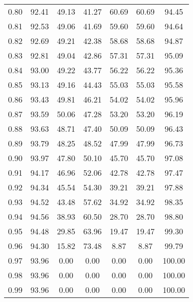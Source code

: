 \begin{tabular}{|c|c|c|c|c|c|c|}
      0.80 &     92.41 &     49.13 &      41.27 &   60.69 &      60.69 &         94.45 \\
      0.81 &     92.53 &     49.06 &      41.69 &   59.60 &      59.60 &         94.64 \\
      0.82 &     92.69 &     49.21 &      42.38 &   58.68 &      58.68 &         94.87 \\
      0.83 &     92.81 &     49.04 &      42.86 &   57.31 &      57.31 &         95.09 \\
      0.84 &     93.00 &     49.22 &      43.77 &   56.22 &      56.22 &         95.36 \\
      0.85 &     93.13 &     49.16 &      44.43 &   55.03 &      55.03 &         95.58 \\
      0.86 &     93.43 &     49.81 &      46.21 &   54.02 &      54.02 &         95.96 \\
      0.87 &     93.59 &     50.06 &      47.28 &   53.20 &      53.20 &         96.19 \\
      0.88 &     93.63 &     48.71 &      47.40 &   50.09 &      50.09 &         96.43 \\
      0.89 &     93.79 &     48.25 &      48.52 &   47.99 &      47.99 &         96.73 \\
      0.90 &     93.97 &     47.80 &      50.10 &   45.70 &      45.70 &         97.08 \\
      0.91 &     94.17 &     46.96 &      52.06 &   42.78 &      42.78 &         97.47 \\
      0.92 &     94.34 &     45.54 &      54.30 &   39.21 &      39.21 &         97.88 \\
      0.93 &     94.52 &     43.48 &      57.62 &   34.92 &      34.92 &         98.35 \\
      0.94 &     94.56 &     38.93 &      60.50 &   28.70 &      28.70 &         98.80 \\
      0.95 &     94.48 &     29.85 &      63.96 &   19.47 &      19.47 &         99.30 \\
      0.96 &     94.30 &     15.82 &      73.48 &    8.87 &       8.87 &         99.79 \\
      0.97 &     93.96 &      0.00 &       0.00 &    0.00 &       0.00 &        100.00 \\
      0.98 &     93.96 &      0.00 &       0.00 &    0.00 &       0.00 &        100.00 \\
      0.99 &     93.96 &      0.00 &       0.00 &    0.00 &       0.00 &        100.00 \\
\bottomrule
\end{tabular}

